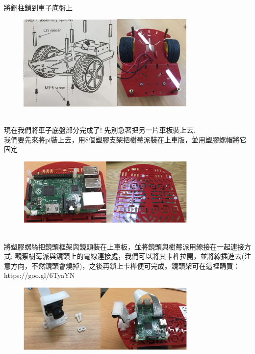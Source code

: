 \documentclass{article}
\begin{document}
\\
\\\\\\\\\\\\\\將銅柱鎖到車子底盤上
\\
\begin{figure}[htp]
    \begin{center}
        \includegraphics[width=250pt]{pic/1_1_18.png}
    \end{center}
\end{figure}
\\
現在我們將車子底盤部分完成了! 先別急著把另一片車板裝上去.
\\我們要先來將pi裝上去，用8個塑膠支架把樹莓派裝在上車版，並用塑膠螺帽將它固定
\\
\begin{figure}[htp]
    \begin{center}
        \includegraphics[width=250pt]{pic/1_1_19.png}
    \end{center}
\end{figure}
\\
將塑膠螺絲把鏡頭框架與鏡頭裝在上車板，並將鏡頭與樹莓派用線接在一起連接方式: 觀察樹莓派與鏡頭上的電線連接處，我們可以將其卡榫拉開，並將線插進去(注意方向，不然鏡頭會燒掉)，之後再鎖上卡榫便可完成。鏡頭架可在這裡購買：https://goo.gl/6TyaYN
\\
\begin{figure}[htp]
    \begin{center}
        \includegraphics[width=250pt]{pic/1_1_20.png}
    \end{center}
\end{figure}
\end{document}

